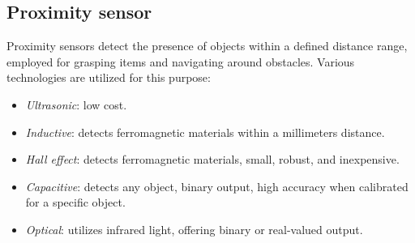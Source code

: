 \subsection{Proximity sensor}
Proximity sensors detect the presence of objects within a defined distance range, employed for grasping items and navigating around obstacles. 
Various technologies are utilized for this purpose:
\begin{itemize}
    \item \textit{Ultrasonic}: low cost.
    \item \textit{Inductive}: detects ferromagnetic materials within a millimeters distance.
    \item \textit{Hall effect}: detects ferromagnetic materials, small, robust, and inexpensive.
    \item \textit{Capacitive}: detects any object, binary output, high accuracy when calibrated for a specific object.
    \item \textit{Optical}: utilizes infrared light, offering binary or real-valued output.
\end{itemize}